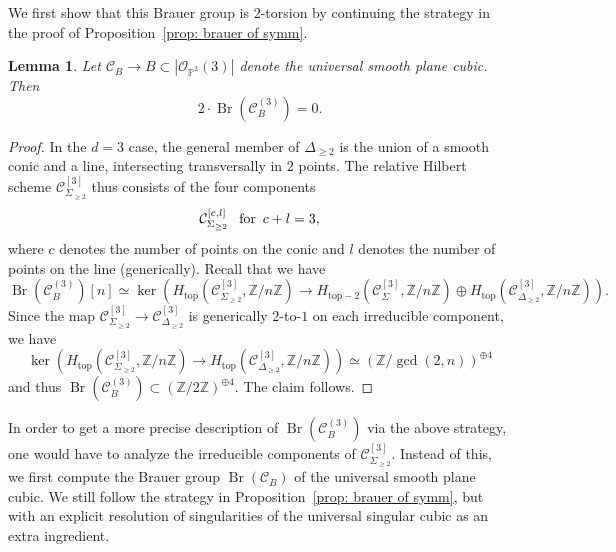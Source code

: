 \documentclass[11pt]{amsart}
\theoremstyle{plain}
\newtheorem{lem}[thm]{Lemma}
\theoremstyle{definition}
\theoremstyle{remark}
\DeclareMathOperator{\Br}{Br}
\begin{document}
We first show that this Brauer group is $2$-torsion by continuing the strategy in the proof of Proposition~\ref{prop: brauer of symm}.
\begin{lem}\label{lem: brauersymm2}
    Let $\mathcal C_B \to B \subset |\mathcal O_{\mathbb P^2}(3)|$ denote the universal smooth plane cubic. Then
    $$2\cdot\Br(\mathcal C^{(3)}_B) = 0.$$
\end{lem}
\begin{proof}
In the $d = 3$ case, the general member of $\Delta_{\geq 2}$ is the union of a smooth conic and a line, intersecting transversally in $2$ points. The relative Hilbert scheme $\mathcal C^{[3]}_{\Sigma_{\geq 2}}$ thus consists of the four components
$$\mathcal C^{[c, l]}_{\Sigma_{\geq 2}} \text{\;\, for \,} c  + l = 3,$$
where $c$ denotes the number of points on the conic and $l$ denotes the number of points on the line (generically). 
Recall that we have 
$$\Br(\mathcal C^{(3)}_B)[n] \simeq \ker(H_{\mathrm{top}}(\mathcal C^{[3]}_{\Sigma_{\geq 2}}, \mathbb Z / n\mathbb Z) \to H_{\mathrm{top}-2}(\mathcal C^{[3]}_{\Sigma}, \mathbb Z / n \mathbb Z) \oplus H_{\mathrm{top}}(\mathcal C_{\Delta_{\geq 2}}^{[3]}, \mathbb Z / n \mathbb Z)).$$
Since the map $\mathcal C^{[3]}_{\Sigma_{\geq 2}} \to \mathcal C^{[3]}_{\Delta_{\geq 2}}$ is generically $2$-to-$1$ on each irreducible component, we have
$$\ker(H_{\mathrm{top}}(\mathcal C^{[3]}_{\Sigma_{\geq 2}}, \mathbb Z / n\mathbb Z) \to H_{\mathrm{top}}(\mathcal C_{\Delta_{\geq 2}}^{[3]}, \mathbb Z / n \mathbb Z)) \simeq (\mathbb Z / \gcd(2, n))^{\oplus 4}$$
and thus $\Br(\mathcal C^{(3)}_B) \subset (\mathbb Z / 2 \mathbb Z)^{\oplus 4}$. The claim follows.
\end{proof}

In order to get a more precise description of $\Br(\mathcal C^{(3)}_B)$ via the above strategy, one would have to analyze the irreducible components of $\mathcal C^{[3]}_{\Sigma_{\geq 2}}$. %
Instead of this, we first compute the Brauer group $\Br(\mathcal C_B)$ of the universal smooth plane cubic. We still follow the strategy in Proposition~\ref{prop: brauer of symm}, but with an explicit resolution of singularities of the universal singular cubic as an extra ingredient.
\end{document}
